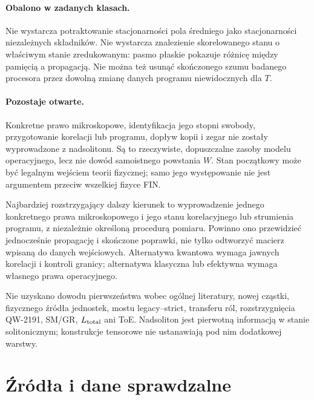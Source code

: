 \documentclass[11pt,a4paper]{article}
\begin{document}
\paragraph{Obalono w zadanych klasach.}
Nie wystarcza potraktowanie stacjonarności pola średniego jako
stacjonarności niezależnych składników. Nie wystarcza znalezienie
skorelowanego stanu o właściwym stanie zredukowanym: pasmo płaskie pokazuje
różnicę między pamięcią a propagacją. Nie można też usunąć skończonego
szumu badanego procesora przez dowolną zmianę danych programu
niewidocznych dla $T$.

\paragraph{Pozostaje otwarte.}
Konkretne prawo mikroskopowe, identyfikacja jego stopni swobody,
przygotowanie korelacji lub programu, dopływ kopii i zegar nie zostały
wyprowadzone z nadsolitonu. Są to rzeczywiste, dopuszczalne zasoby
modelu operacyjnego, lecz nie dowód samoistnego powstania $W$.
Stan początkowy może być legalnym wejściem teorii fizycznej; samo
jego występowanie nie jest argumentem przeciw wszelkiej fizyce FIN.

Najbardziej rozstrzygający dalszy kierunek to wyprowadzenie jednego
konkretnego prawa mikroskopowego i jego stanu korelacyjnego lub
strumienia programu, z niezależnie określoną procedurą pomiaru.
Powinno ono przewidzieć jednocześnie propagację i skończone poprawki,
nie tylko odtworzyć macierz wpisaną do danych wejściowych.
Alternatywa kwantowa wymaga jawnych korelacji i kontroli granicy;
alternatywa klasyczna lub efektywna wymaga własnego prawa operacyjnego.

Nie uzyskano dowodu pierwszeństwa wobec ogólnej literatury, nowej
cząstki, fizycznego źródła jednostek, mostu legacy--strict, transferu
ról, rozstrzygnięcia QW-2191, SM/GR, $L_{\rm total}$ ani ToE.
Nadsoliton jest pierwotną informacją w stanie solitonicznym;
konstrukcje tensorowe nie ustanawiają pod nim dodatkowej warstwy.

\section*{Źródła i dane sprawdzalne}
\end{document}
